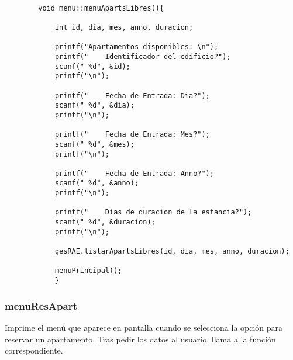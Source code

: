 \documentclass[12pt]{article}
\begin{document}
		\begin{lstlisting}

		void menu::menuApartsLibres(){
			
			int id, dia, mes, anno, duracion;
			
			printf("Apartamentos disponibles: \n");
			printf("    Identificador del edificio?");
			scanf(" %d", &id);
			printf("\n");
			
			printf("    Fecha de Entrada: Dia?");
			scanf(" %d", &dia);
			printf("\n");
			
			printf("    Fecha de Entrada: Mes?");
			scanf(" %d", &mes);
			printf("\n");
			
			printf("    Fecha de Entrada: Anno?");
			scanf(" %d", &anno);
			printf("\n");
			
			printf("    Dias de duracion de la estancia?");
			scanf(" %d", &duracion);
			printf("\n");
			
			gesRAE.listarApartsLibres(id, dia, mes, anno, duracion);
			
			menuPrincipal();
			}
			\end{lstlisting}
				
			\subsubsection{menuResApart}
			Imprime el menú que aparece en pantalla cuando se selecciona la opción para reservar un apartamento. Tras pedir los datos al usuario, llama a la función correspondiente.
			
\end{document}
